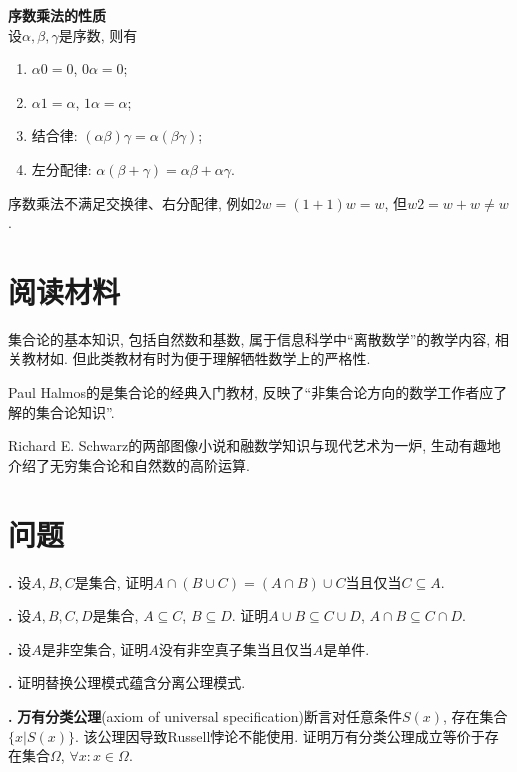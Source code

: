 \begin{pro}\textbf{序数乘法的性质}\\
设$\alpha,\beta, \gamma$是序数, 则有
\begin{enumerate}
\item $\alpha 0=0$, $0\alpha =0$;
\item $\alpha 1=\alpha$, $1\alpha =\alpha$;
\item 结合律: $(\alpha\beta)\gamma=\alpha(\beta\gamma)$;
\item 左分配律: $\alpha(\beta+\gamma)=\alpha\beta+\alpha\gamma$.
\end{enumerate}
\end{pro}
序数乘法不满足交换律、右分配律, 例如$2w=(1+1)w=w$, 但$w2=w+w\neq w$. 

\section*{阅读材料}
\par 集合论的基本知识, 包括自然数和基数, 属于信息科学中“离散数学”的教学内容, 相关教材如\cite{DMA}. 但此类教材有时为便于理解牺牲数学上的严格性. 
\par Paul Halmos的\cite{NST}是集合论的经典入门教材, 反映了“非集合论方向的数学工作者应了解的集合论知识”. 
\par Richard E. Schwarz的两部图像小说\cite{GI}和\cite{RBN}融数学知识与现代艺术为一炉, 生动有趣地介绍了无穷集合论和自然数的高阶运算. 

\section*{问题}
\par \textbf{\theprobset .} \cite{NST} 设$A,B,C$是集合, 证明$A\cap (B \cup C)=(A\cap B) \cup C$当且仅当$C\subseteq A$. 

\par \textbf{\theprobset .} \cite{AnT1} 设$A,B,C,D$是集合, $A\subseteq C$, $B\subseteq D$. 证明$A\cup B\subseteq C\cup D$, $A\cap B\subseteq C\cap D$.

\par \textbf{\theprobset .} \cite{AnT1} 设$A$是非空集合, 证明$A$没有非空真子集当且仅当$A$是单件. 

\par \textbf{\theprobset .} 证明替换公理模式蕴含分离公理模式. 

\par \textbf{\theprobset .} \cite{AnT1} \textbf{万有分类公理}(axiom of universal specification)断言对任意条件$S(x)$, 存在集合$\{x\vert S(x)\}$. 该公理因导致Russell悖论不能使用. 证明万有分类公理成立等价于存在集合$\Omega$, $\forall x: x\in \Omega$. 


